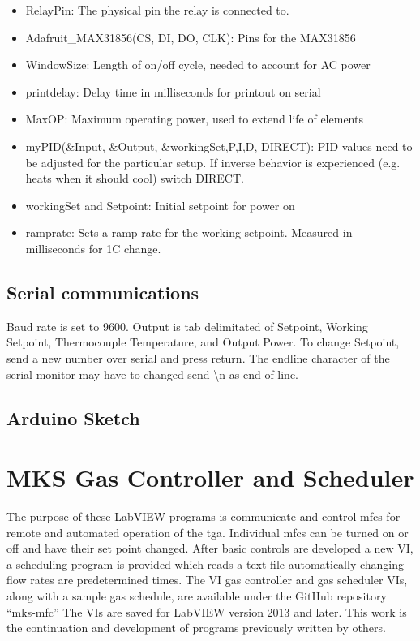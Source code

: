         \begin{itemize}
        \item
          RelayPin: The physical pin the relay is connected to.
        \item
          Adafruit\_MAX31856(CS, DI, DO, CLK): Pins for the MAX31856
        \item
          WindowSize: Length of on/off cycle, needed to account for AC power
        \item
          printdelay: Delay time in milliseconds for printout on serial
        \item
          MaxOP: Maximum operating power, used to extend life of elements
        \item
          myPID(\&Input, \&Output, \&workingSet,P,I,D, DIRECT): PID values need to be adjusted for the particular setup.
          If inverse behavior is experienced (e.g. heats when it should cool) switch DIRECT.
        \item
          workingSet and Setpoint: Initial setpoint for power on
        \item
          ramprate: Sets a ramp rate for the working setpoint. Measured in
          milliseconds for 1C change.
        \end{itemize}

    \subsection{Serial communications}
        Baud rate is set to 9600.
        Output is tab delimitated of Setpoint, Working
        Setpoint, Thermocouple Temperature, and Output Power.
        To change Setpoint, send a new number over serial and press return.
        The endline character of the serial monitor may have to changed send \textbackslash n as end of line.

    \subsection{Arduino Sketch}
        

\section{MKS Gas Controller and Scheduler}
    \label{app:gasvi}
    The purpose of these LabVIEW programs is communicate and control \glspl{mfc} for remote and automated operation of the \gls{tga}.
    Individual \glspl{mfc} can be turned on or off and have their set point changed.
    After basic controls are developed a new VI, a scheduling program is provided which reads a text file automatically changing flow rates are predetermined times.
    The VI gas controller and gas scheduler VIs, along with a sample gas schedule, are available under the GitHub repository ``mks-mfc''
    The VIs are saved for LabVIEW version 2013 and later.
    This work is the continuation and development of programs previously written by others.

